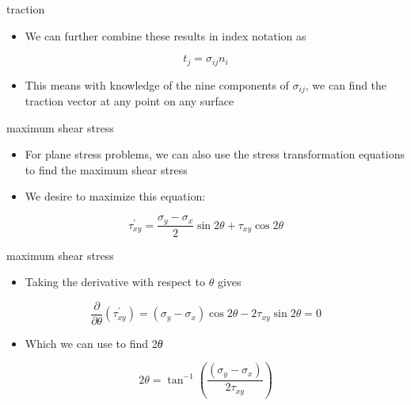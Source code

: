 \documentclass[
  letterpaper,
  ignorenonframetext,
  aspectratio=43,
  handout,
  12pt]{beamer}
\providecommand{\tightlist}{%
  \setlength{\itemsep}{0pt}\setlength{\parskip}{0pt}}
\providecommand{\tightlist}{%
\setlength{\itemsep}{0pt}\setlength{\parskip}{0pt}}
\begin{document}
\begin{frame}{traction}
\protect\hypertarget{traction-4}{}
\begin{itemize}
\tightlist
\item
  We can further combine these results in index notation as
\end{itemize}

\[t_j = \sigma_{ij}n_i\]

\begin{itemize}
\tightlist
\item
  This means with knowledge of the nine components of \(\sigma_{ij}\),
  we can find the traction vector at any point on any surface
\end{itemize}
\end{frame}

\begin{frame}{maximum shear stress}
\protect\hypertarget{maximum-shear-stress}{}
\begin{itemize}
\tightlist
\item
  For plane stress problems, we can also use the stress transformation
  equations to find the maximum shear stress
\item
  We desire to maximize this equation:
\end{itemize}

\[\tau^\prime_{xy} = \frac{\sigma_y - \sigma_x}{2}\sin 2\theta + \tau_{xy} \cos 2\theta\]
\end{frame}

\begin{frame}{maximum shear stress}
\protect\hypertarget{maximum-shear-stress-1}{}
\begin{itemize}
\tightlist
\item
  Taking the derivative with respect to \(\theta\) gives
\end{itemize}

\[\frac{\partial}{\partial \theta} (\tau^\prime_{xy}) = (\sigma_y-\sigma_x)\cos 2\theta - 2\tau_{xy} \sin 2\theta = 0\]

\begin{itemize}
\tightlist
\item
  Which we can use to find 2\emph{θ}
\end{itemize}

\[2\theta = \tan ^{-1} \left(\frac{(\sigma_y-\sigma_x)}{2\tau_{xy}}\right)\]
\end{frame}
\end{document}
